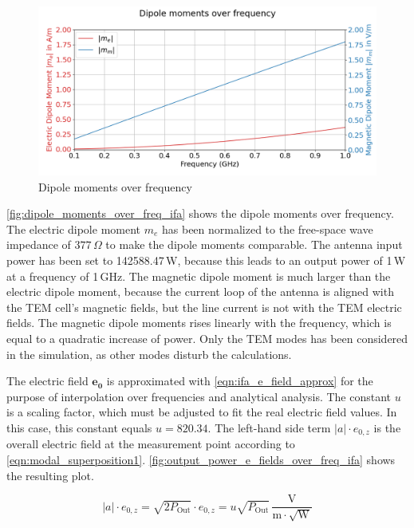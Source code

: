 \begin{figure}[h]
    \centering
    \includegraphics[width=1\linewidth]{Documentation/content/30_simulations/img/dipole_moments_over_freq_ifa.png}
    \caption{Dipole moments over frequency}
    \label{fig:dipole_moments_over_freq_ifa}
\end{figure}

\autoref{fig:dipole_moments_over_freq_ifa} shows the dipole moments over frequency. The electric dipole moment $m_e$ has been normalized to the free-space wave impedance of $377\,\Omega$ to make the dipole moments comparable. The antenna input power has been set to 142588.47\,W, because this leads to an output power of 1\,W at a frequency of 1\,GHz. The magnetic dipole moment is much larger than the electric dipole moment, because the current loop of the antenna is aligned with the TEM cell's magnetic fields, but the line current is not with the TEM electric fields. The magnetic dipole moments rises linearly with the frequency, which is equal to a quadratic increase of power. Only the TEM modes has been considered in the simulation, as other modes disturb the calculations. 

The electric field $\mathbf{e_0}$ is approximated with \autoref{eqn:ifa_e_field_approx} for the purpose of interpolation over frequencies and analytical analysis. The constant $u$ is a scaling factor, which must be adjusted to fit the real electric field values. In this case, this constant equals $u=820.34$. The left-hand side term $|a|\cdot e_{0,z}$ is the overall electric field at the measurement point according to \autoref{eqn:modal_superposition1}. \autoref{fig:output_power_e_fields_over_freq_ifa} shows the resulting plot. 

\begin{equation}
    |a|\cdot e_{0,z}=\sqrt{2P_\mathrm{Out}}\cdot e_{0,z}=u\sqrt{P_\mathrm{Out}}\,\mathrm{\frac{V}{m\cdot\sqrt{W}}}
    \label{eqn:ifa_e_field_approx}
\end{equation}

